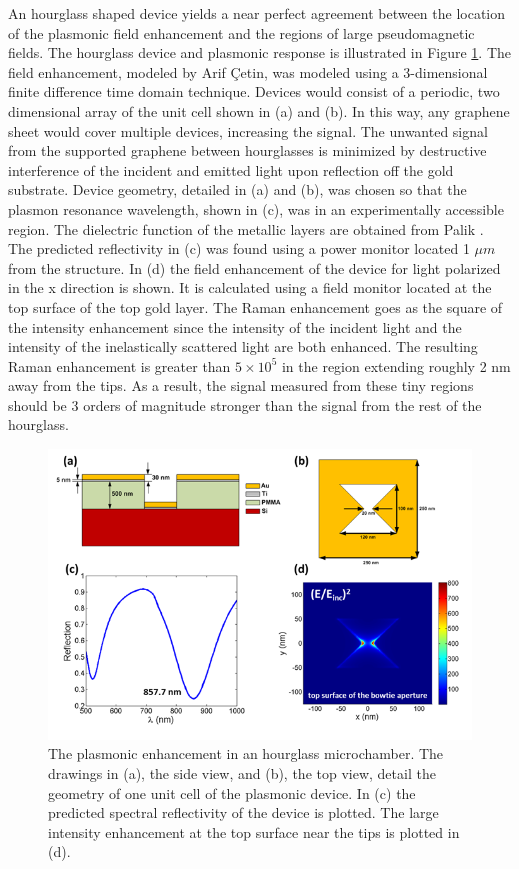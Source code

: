 An hourglass shaped device yields a near perfect agreement between the location of the plasmonic field enhancement and the regions of large pseudomagnetic fields.
The hourglass device and plasmonic response is illustrated in Figure \ref{fig:PVP:hourglass_Plas}.
The field enhancement, modeled by Arif \c{C}etin, was modeled using a 3-dimensional finite difference time domain technique.
Devices would consist of a periodic, two dimensional array of the unit cell shown in (a) and (b).
In this way, any graphene sheet would cover multiple devices, increasing the signal.
The unwanted signal from the supported graphene between hourglasses is minimized by destructive interference of the incident and emitted light upon reflection off the gold substrate.
Device geometry, detailed in (a) and (b), was chosen so that the plasmon resonance wavelength, shown in (c), was in an experimentally accessible region.
The dielectric function of the metallic layers are obtained from Palik \cite{Palik1985}.
The predicted reflectivity in (c) was found using a power monitor located 1 $\mu m$ from the structure.
In (d) the field enhancement of the device for light polarized in the x direction is shown.
It is calculated using a field monitor located at the top surface of the top gold layer.
The Raman enhancement goes as the square of the intensity enhancement since the intensity of the incident light and the intensity of the inelastically scattered light are both enhanced.
The resulting Raman enhancement is greater than $5 \times 10^5$ in the region extending roughly 2 nm away from the tips.
As a result, the signal measured from these tiny regions should be 3 orders of magnitude stronger than the signal from the rest of the hourglass.

\begin{figure}
  \begin{center}
  \includegraphics[scale=.75]{Figs_PVP/HourGlass_Plasmonics.png}
  \end{center}
  \caption[Plasmonic enhancement in hourglass microchambers]{\label{fig:PVP:hourglass_Plas}
  The plasmonic enhancement in an hourglass microchamber.
  The drawings in (a), the side view, and (b), the top view, detail the geometry of one unit cell of the plasmonic device.
  In (c) the predicted spectral reflectivity of the device is plotted.
  The large intensity enhancement at the top surface near the tips is plotted in (d).}
\end{figure}

